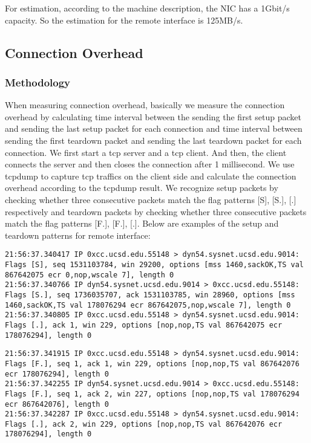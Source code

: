 For estimation, according to the machine description, the NIC has a 1Gbit/s capacity. So the estimation for the remote interface is 125MB/s.

\subsection{Connection Overhead}

\subsubsection{Methodology}
When measuring connection overhead, basically we measure the connection overhead by calculating time interval between the sending the first setup packet and sending the last setup packet for each connection and time interval between sending the first teardown packet and sending the last teardown packet for each connection. We first start a tcp server and a tcp client. And then, the client connects the server and then closes the connection after 1 millisecond. We use tcpdump to capture tcp traffics on the client side and calculate the connection overhead according to the tcpdump result.  We recognize setup packets by checking whether three consecutive packets match the flag patterns [S], [S.], [.] respectively and teardown packets by checking whether three consecutive packets match the flag patterns [F.], [F.], [.]. Below are examples of the setup and teardown patterns for remote interface:

\begin{lstlisting}
21:56:37.340417 IP 0xcc.ucsd.edu.55148 > dyn54.sysnet.ucsd.edu.9014: Flags [S], seq 1531103784, win 29200, options [mss 1460,sackOK,TS val 867642075 ecr 0,nop,wscale 7], length 0
21:56:37.340766 IP dyn54.sysnet.ucsd.edu.9014 > 0xcc.ucsd.edu.55148: Flags [S.], seq 1736035707, ack 1531103785, win 28960, options [mss 1460,sackOK,TS val 178076294 ecr 867642075,nop,wscale 7], length 0
21:56:37.340805 IP 0xcc.ucsd.edu.55148 > dyn54.sysnet.ucsd.edu.9014: Flags [.], ack 1, win 229, options [nop,nop,TS val 867642075 ecr 178076294], length 0
\end{lstlisting}

\begin{lstlisting}
21:56:37.341915 IP 0xcc.ucsd.edu.55148 > dyn54.sysnet.ucsd.edu.9014: Flags [F.], seq 1, ack 1, win 229, options [nop,nop,TS val 867642076 ecr 178076294], length 0
21:56:37.342255 IP dyn54.sysnet.ucsd.edu.9014 > 0xcc.ucsd.edu.55148: Flags [F.], seq 1, ack 2, win 227, options [nop,nop,TS val 178076294 ecr 867642076], length 0
21:56:37.342287 IP 0xcc.ucsd.edu.55148 > dyn54.sysnet.ucsd.edu.9014: Flags [.], ack 2, win 229, options [nop,nop,TS val 867642076 ecr 178076294], length 0
\end{lstlisting}

